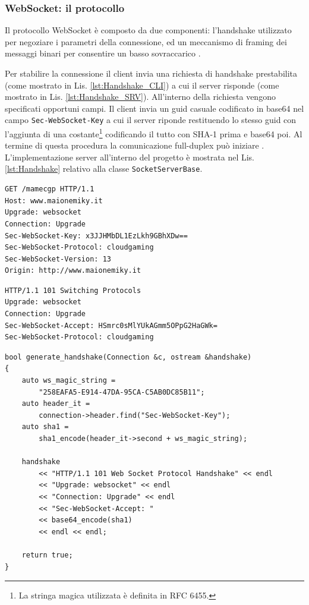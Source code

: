 \subsubsection{WebSocket: il protocollo}
Il protocollo WebSocket è composto da due componenti: l'handshake utilizzato per negoziare i parametri della connessione, ed un meccanismo di framing dei messaggi binari per consentire un basso sovraccarico \parencite{High_Performance_Browser_Networking}.

Per stabilire la connessione il client invia una richiesta di handshake prestabilita (come mostrato in Lis. \ref{lst:Handshake_CLI}) a cui il server risponde (come mostrato in Lis. \ref{lst:Handshake_SRV}). All'interno della richiesta vengono specificati opportuni campi. Il client invia un guid casuale codificato in base64 nel campo \verb|Sec-WebSocket-Key| a cui il server riponde restituendo lo stesso guid con l'aggiunta di una costante\footnote{La stringa magica utilizzata è definita in RFC 6455.} codificando il tutto con SHA-1 prima e base64 poi. Al termine di questa procedura la comunicazione full-duplex può iniziare \parencite{Writing_WebSocket_servers}. L'implementazione server all'interno del progetto è mostrata nel Lis. \ref{lst:Handshake} relativo alla classe \verb|SocketServerBase|.

\begin{lstlisting}[language=HTML, caption=Richiesta handshake da parte del client, label={lst:Handshake_CLI}]
GET /mamecgp HTTP/1.1
Host: www.maionemiky.it
Upgrade: websocket
Connection: Upgrade
Sec-WebSocket-Key: x3JJHMbDL1EzLkh9GBhXDw==	
Sec-WebSocket-Protocol: cloudgaming
Sec-WebSocket-Version: 13
Origin: http://www.maionemiky.it
\end{lstlisting}

\begin{lstlisting}[language=HTML, caption=Risposta handshake da parte del server, label={lst:Handshake_SRV}]
HTTP/1.1 101 Switching Protocols
Upgrade: websocket
Connection: Upgrade
Sec-WebSocket-Accept: HSmrc0sMlYUkAGmm5OPpG2HaGWk=
Sec-WebSocket-Protocol: cloudgaming
\end{lstlisting}

\begin{lstlisting}[caption=Codice dell'handshake implementato in SocketServerBase, label={lst:Handshake}]
bool generate_handshake(Connection &c, ostream &handshake)
{
	auto ws_magic_string =
		"258EAFA5-E914-47DA-95CA-C5AB0DC85B11";
	auto header_it = 
		connection->header.find("Sec-WebSocket-Key");	
	auto sha1 =
		sha1_encode(header_it->second + ws_magic_string);

	handshake
		<< "HTTP/1.1 101 Web Socket Protocol Handshake" << endl
		<< "Upgrade: websocket" << endl
		<< "Connection: Upgrade" << endl
		<< "Sec-WebSocket-Accept: "
		<< base64_encode(sha1)			
		<< endl << endl;

	return true;
}
\end{lstlisting}

